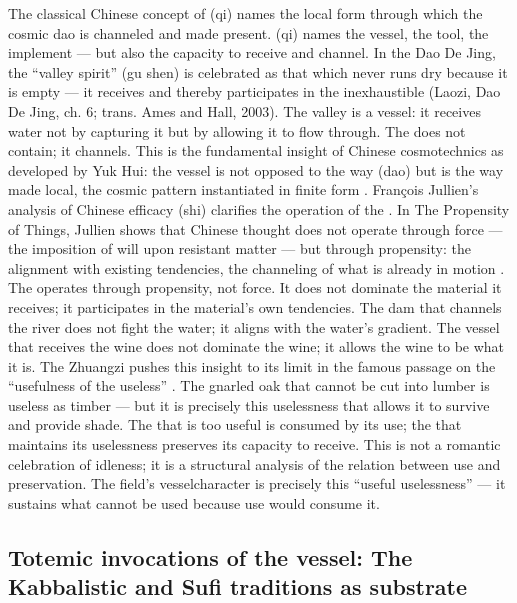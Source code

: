 The classical Chinese concept of  (qi) names the local form through which the cosmic dao is channeled and made present. (qi) names the vessel, the tool, the implement — but also the capacity to receive and channel. In the Dao De Jing, the “valley spirit” (gu shen) is celebrated as that which never runs dry because it is empty — it receives and thereby participates in the inexhaustible (Laozi, Dao De Jing, ch. 6; trans. Ames and Hall, 2003). The valley is a vessel: it receives water not by capturing it but by allowing it to flow through. The  does not contain; it channels. This is the fundamental insight of Chinese cosmotechnics as developed by Yuk Hui: the vessel is not opposed to the way (dao) but is the way made local, the cosmic pattern instantiated in finite form \cite{hui_2017}. François Jullien’s analysis of Chinese efficacy (shi) clarifies the operation of the . In The Propensity of Things, Jullien shows that Chinese thought does not operate through force — the imposition of will upon resistant matter — but through propensity: the alignment with existing tendencies, the channeling of what is already in motion \cite{jullien_1992}. The  operates through propensity, not force. It does not dominate the material it receives; it participates in the material’s own tendencies. The dam that channels the river does not fight the water; it aligns with the water’s gradient. The vessel that receives the wine does not dominate the wine; it allows the wine to be what it is. The Zhuangzi pushes this insight to its limit in the famous passage on the “usefulness of the useless” \cite[ch.~4]{zhuangzi_2009}. The gnarled oak that cannot be cut into lumber is useless as timber — but it is precisely this uselessness that allows it to survive and provide shade. The  that is too useful is consumed by its use; the  that maintains its uselessness preserves its capacity to receive. This is not a romantic celebration of idleness; it is a structural analysis of the relation between use and preservation. The field’s vesselcharacter is precisely this “useful uselessness” — it sustains what cannot be used because use would consume it.

\subsection{Totemic invocations of the vessel: The Kabbalistic and Sufi traditions as substrate}

